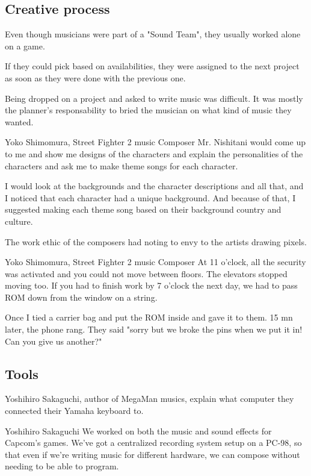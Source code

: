 \subsection{Creative process}
Even though musicians were part of a "Sound Team", they usually worked alone on a game. 

If they could pick based on availabilities\cite{sf2musics}, they were assigned to the next project as soon as they were done with the previous one.


Being dropped on a project and asked to write music was difficult. It was mostly the planner's responsability to bried the musician on what kind of music they wanted\cite{sf2_music}.

\begin{q}{Yoko Shimomura, Street Fighter 2 music Composer\cite{sf2_oral_history}}
Mr. Nishitani would come up to me and show me designs of the characters and explain the personalities of the characters and ask me to make theme songs for each character.

I would look at the backgrounds and the character descriptions and all that, and I noticed that each character had a unique background. And because of that, I suggested making each theme song based on their background country and culture.
\end{q}

The work ethic of the composers had noting to envy to the artists drawing pixels.

\begin{q}{Yoko Shimomura, Street Fighter 2 music Composer\cite{sf2musicsecurity}}
At 11 o'clock, all the security was activated and you could not move between floors. The elevators stopped moving too. If you had to finish work by 7 o'clock the next day, we had to pass ROM down from the window on a string.

Once I tied a carrier bag and put the ROM inside and gave it to them. 15 mn later, the phone rang. They said "sorry but we broke the pins when we put it in! Can you give us another?"
\end{q}



\subsection{Tools}
Yoshihiro Sakaguchi, author of MegaMan musics, explain what computer they connected their Yamaha keyboard to.

\begin{q}{Yoshihiro Sakaguchi\cite{yoko_shimomura_interview}  }
We worked on both the music and sound effects for Capcom’s games. We’ve got a centralized recording system setup on a PC-98, so that even if we’re writing music for different hardware, we can compose without needing to be able to program.
\end{q}

